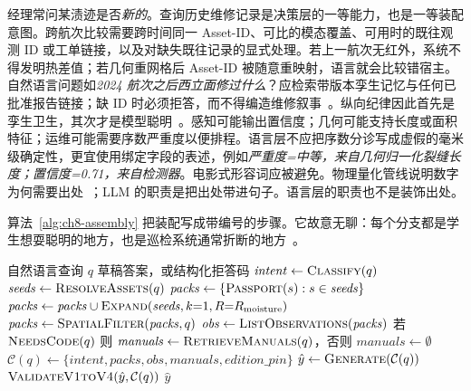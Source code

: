 经理常问某渍迹是否\emph{新的}。查询历史维修记录是决策层的一等能力，也是一等装配意图。跨航次比较需要跨时间同一 Asset-ID、可比的模态覆盖、可用时的既往观测 ID 或工单链接，以及对缺失既往记录的显式处理。若上一航次无红外，系统不得发明热差值；若几何重网格后 Asset-ID 被随意重映射，语言就会比较错宿主。自然语言问题如\emph{2024 航次之后西立面修过什么}？应检索带版本孪生记忆与任何已批准报告链接；缺 ID 时必须拒答，而不得编造维修叙事~\cite{zhang2025,yang2025detreconreg,chen2023facility}。纵向纪律因此首先是孪生卫生，其次才是模型聪明~\cite{zhang2025,yang2025detreconreg,zhao2026physical}。感知可能输出置信度；几何可能支持长度或面积特征；运维可能需要序数严重度以便排程。语言层不应把序数分诊写成虚假的毫米级确定性，更宜使用绑定字段的表述，例如\emph{严重度=中等，来自几何归一化裂缝长度；置信度=0.71，来自检测器}。电影式形容词应被避免。物理量化管线说明数字为何需要出处~\cite{zhao2024facade,zhao2026physical}；LLM 的职责是把出处带进句子。语言层的职责也不是装饰出处。

算法~\ref{alg:ch8-assembly} 把装配写成带编号的步骤。它故意无聊：每个分支都是学生想耍聪明的地方，也是巡检系统通常折断的地方~\cite{lewis2020,peng2024,jeon2025hybridrag}。

\begin{algorithm}[htbp]
\caption{面向接地巡检答案的意图条件孪生装配。}
\label{alg:ch8-assembly}
\begin{algorithmic}[1]
\Require 自然语言查询 $q$
\Ensure 草稿答案，或结构化拒答码
\State $\mathit{intent} \gets \textsc{Classify}(q)$
\State $\mathit{seeds} \gets \textsc{ResolveAssets}(q)$ 
\State $\mathit{packs} \gets \{\textsc{Passport}(s): s\in\mathit{seeds}\}$
 \State $\mathit{packs} \gets \mathit{packs}\cup\textsc{Expand}(\mathit{seeds},k{=}1,R{=}R_{\mathrm{moisture}})$
\EndIf
{}
 \State $\mathit{packs} \gets \textsc{SpatialFilter}(\mathit{packs},q)$
\EndIf
\State $\mathit{obs} \gets \textsc{ListObservations}(\mathit{packs})$
\State 若 $\textsc{NeedsCode}(q)$ 则 $\mathit{manuals} \gets \textsc{RetrieveManuals}(q)$，否则 $\mathit{manuals} \gets \emptyset$
\State $\mathcal{C}(q) \gets \{\mathit{intent},\mathit{packs},\mathit{obs},\mathit{manuals},\mathit{edition\_pin}\}$
\State $\hat{y} \gets \textsc{Generate}(\mathcal{C}(q))$
\State $\textsc{ValidateV1toV4}(\hat{y},\mathcal{C}(q))$ 
\State \Return $\hat{y}$
\end{algorithmic}
\end{algorithm}

